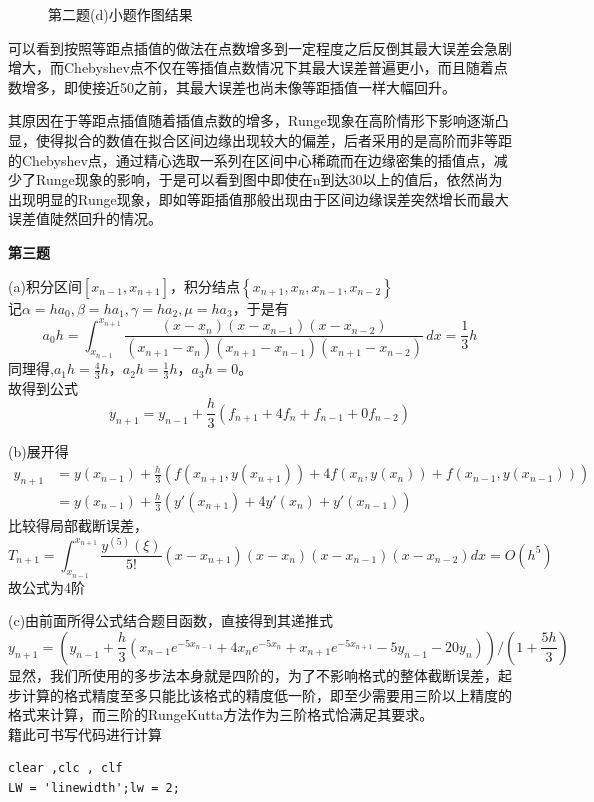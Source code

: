 \documentclass[12pt,a4paper,utf8]{ctexart}
\begin{document}
\begin{enumerate}
\begin{figure}[htbp]
    \caption{第二题(d)小题作图结果}
\end{figure}
可以看到按照等距点插值的做法在点数增多到一定程度之后反倒其最大误差会急剧增大，而Chebyshev点不仅在等插值点数情况下其最大误差普遍更小，而且随着点数增多，即使接近50之前，其最大误差也尚未像等距插值一样大幅回升。

其原因在于等距点插值随着插值点数的增多，Runge现象在高阶情形下影响逐渐凸显，使得拟合的数值在拟合区间边缘出现较大的偏差，后者采用的是高阶而非等距的Chebyshev点，通过精心选取一系列在区间中心稀疏而在边缘密集的插值点，减少了Runge现象的影响，于是可以看到图中即使在n到达30以上的值后，依然尚为出现明显的Runge现象，即如等距插值那般出现由于区间边缘误差突然增长而最大误差值陡然回升的情况。

\textbf{第三题} 

(a)积分区间$[x_{n-1}, x_{n+1}]$，积分结点$\left\{x_{n+1},x_n,x_{n-1},x_{n-2}\right\}$\\
记$\alpha=ha_0,\beta=ha_1,\gamma=ha_2,\mu=ha_3$，于是有
\begin{equation}
    a_0h=\int_{x_{n-1}}^{x_{n+1}} \frac{(x-x_n)(x-x_{n-1})(x-x_{n-2})}{(x_{n+1}-x_n)(x_{n+1}-x_{n-1})(x_{n+1}-x_{n-2})}\, dx =\frac{1}{3}h \nonumber
\end{equation}
同理得,$a_1h=\frac{4}{3}h$，$a_2h=\frac{1}{3}h$，$a_3h=0$。\\
故得到公式
\begin{equation}
    y_{n+1}=y_{n-1}+\frac{h}{3}(f_{n+1}+4f_n+f_{n-1}+0f_{n-2}) \nonumber
\end{equation}

(b)展开得
\begin{equation}
    \begin{aligned}
        y_{n+1}&=y(x_{n-1})+\frac{h}{3}(f(x_{n+1},y(x_{n+1}))+4f(x_n,y(x_n))+f(x_{n-1},y(x_{n-1}))) \\
                &=y(x_{n-1})+\frac{h}{3}(y'(x_{n+1})+4y'(x_n)+y'(x_{n-1}))
    \end{aligned}
    \nonumber
\end{equation}
比较得局部截断误差，
\begin{equation}
    T_{n+1}=\int_{x_{n-1}}^{x_{n+1}}\frac{y^{(5)}(\xi)}{5!}(x-x_{n+1})(x-x_n)(x-x_{n-1})(x-x_{n-2})dx = O(h^5) \nonumber
\end{equation}
故公式为4阶

(c)由前面所得公式结合题目函数，直接得到其递推式
\begin{equation}
    y_{n+1} = (y_{n-1} + \frac{h}{3}(x_{n-1}e^{-5x_{n-1}}+4x_ne^{-5x_n}+x_{n+1}e^{-5x_{n+1}}-5y_{n-1}-20y_n)) \bigg/ (1+\frac{5h}{3}) \nonumber
\end{equation}
显然，我们所使用的多步法本身就是四阶的，为了不影响格式的整体截断误差，起步计算的格式精度至多只能比该格式的精度低一阶，即至少需要用三阶以上精度的格式来计算，而三阶的RungeKutta方法作为三阶格式恰满足其要求。\\
籍此可书写代码进行计算
\begin{lstlisting}[frame=single]
clear ,clc , clf
LW = 'linewidth';lw = 2;


\end{lstlisting}
\end{enumerate}
\end{document}
